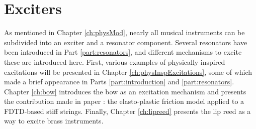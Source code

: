 \chapter*{Exciters}
As mentioned in Chapter \ref{ch:physMod}, nearly all musical instruments can be subdivided into an exciter and a resonator component. Several resonators have been introduced in Part \ref{part:resonators}, and different mechanisms to excite these are introduced here. First, various examples of physically inspired excitations will be presented in Chapter \ref{ch:physInspExcitations}, some of which made a brief appearance in Parts \ref{part:introduction} and \ref{part:resonators}. Chapter \ref{ch:bow} introduces the bow as an excitation mechanism and presents the contribution made in paper \citeP[C]: the elasto-plastic friction model applied to a FDTD-based stiff strings. Finally, Chapter \ref{ch:lipreed} presents the lip reed as a way to excite brass instruments. 
